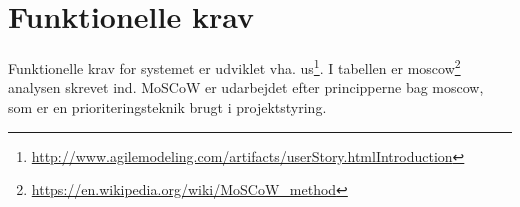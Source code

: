 \section{Funktionelle krav}
Funktionelle krav for systemet er udviklet vha. \gls{us}\footnote{\url{http://www.agilemodeling.com/artifacts/userStory.htmlIntroduction}}.
I tabellen er  \gls{moscow}\footnote{\url{https://en.wikipedia.org/wiki/MoSCoW_method}} analysen skrevet ind. MoSCoW er udarbejdet efter principperne bag \gls{moscow}, som er en prioriteringsteknik brugt i projektstyring.



